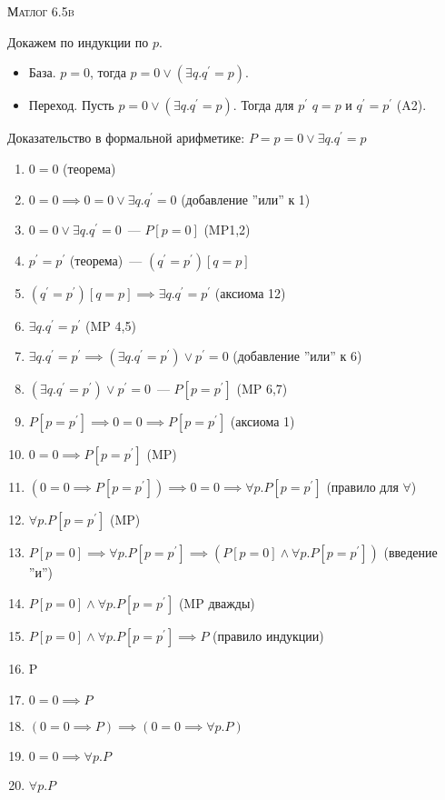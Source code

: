 \documentclass[10pt]{article}
\begin{document}
\def\chap#1#2{\ \\ {\large\bf#1 \ | \ \tt\scshape#2} \par}

\ \vspace{-1cm}

{\bf
\ \\
\Large\centerline{\scshape Матлог 6.5b}
}\normalsize

Докажем по индукции по $p$. 
\begin{itemize}
    \item База. $p=0$, тогда $p=0 \lor (\exists q. q^\prime = p)$.
    \item Переход. Пусть $p = 0 \lor (\exists q. q^\prime = p)$.
    Тогда для $p^\prime$ $q = p$ и $q^\prime = p^\prime$ (A2).  
\end{itemize}

Доказательство в формальной арифметике: $P = p = 0 \lor \exists q. q^\prime = p$
\begin{enumerate}
    \item $0 = 0$ (теорема)
    \item $0=0 \implies 0 = 0 \lor \exists q. q^\prime = 0$ (добавление ''или'' к 1)
    \item $0 = 0 \lor \exists q. q^\prime = 0$~--- $P[p = 0]$ (MP1,2)
    \item $p^\prime = p^\prime$ (теорема)~--- $(q^\prime = p^\prime)[q=p]$
    \item $(q^\prime = p^\prime)[q=p] \implies \exists q. q^\prime = p^\prime$ (аксиома 12)
    \item $\exists q. q^\prime = p^\prime$ (MP 4,5)
    \item $\exists q. q^\prime = p^\prime \implies (\exists q. q^\prime = p^\prime) \lor p^\prime = 0$ (добавление ''или'' к 6)
    \item $(\exists q. q^\prime = p^\prime) \lor p^\prime = 0$~--- $P[p=p^\prime]$ (MP 6,7)
    \item $P[p=p^\prime] \implies 0=0 \implies P[p=p^\prime]$ (аксиома 1)
    \item $0=0 \implies P[p=p^\prime]$ (MP)
    \item $(0=0 \implies P[p=p^\prime]) \implies 0=0 \implies \forall p. P[p = p^\prime]$ (правило для $\forall$)
    \item $\forall p. P[p = p^\prime]$ (MP)
    \item $P[p=0] \implies \forall p. P[p=p^\prime] \implies (P[p=0] \land \forall p. P[p=p^\prime])$ (введение ''и'')
    \item $P[p=0] \land \forall p. P[p=p^\prime]$ (MP дважды)
    \item $P[p=0] \land \forall p. P[p=p^\prime] \implies P$ (правило индукции)
    \item P
    \item $0=0 \implies P$
    \item $(0=0 \implies P) \implies (0=0 \implies \forall p. P)$
    \item $0=0 \implies \forall p. P$
    \item $\forall p. P$
\end{enumerate}
\end{document}
